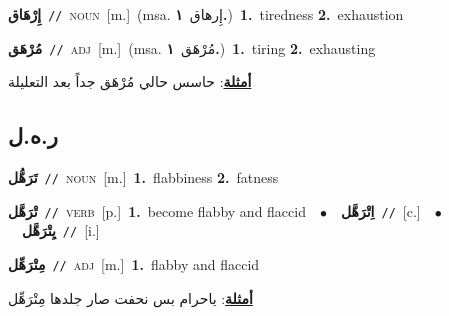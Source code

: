\documentclass[10pt,a4paper,twoside]{article} %
\begin{document}
\begin{multicols}{2}
{\setlength\topsep{0pt}\textbf{\foreignlanguage{arabic}{إِرْهَاق}}\ {\color{gray}\texttt{//}\color{black}}\ \textsc{noun}\ [m.]\ \color{gray}(msa. \foreignlanguage{arabic}{إِرهاق}~\foreignlanguage{arabic}{\textbf{١.}})\color{black}\ \textbf{1.}~tiredness  \textbf{2.}~exhaustion\ } \vspace{2mm}

{\setlength\topsep{0pt}\textbf{\foreignlanguage{arabic}{مُرْهَق}}\ {\color{gray}\texttt{//}\color{black}}\ \textsc{adj}\ [m.]\ \color{gray}(msa. \foreignlanguage{arabic}{مُرْهَق}~\foreignlanguage{arabic}{\textbf{١.}})\color{black}\ \textbf{1.}~tiring  \textbf{2.}~exhausting\  \begin{flushright}\color{gray}\foreignlanguage{arabic}{\textbf{\underline{\foreignlanguage{arabic}{أمثلة}}}: حاسس حالي مُرْهَق جداً بعد التعليلة}\end{flushright}\color{black}} \vspace{2mm}

\vspace{-3mm}
\subsection*{\color{blue}\foreignlanguage{arabic}{ر.ه.ل}\color{blue}{}} 

{\setlength\topsep{0pt}\textbf{\foreignlanguage{arabic}{تَرَهُّل}}\ {\color{gray}\texttt{//}\color{black}}\ \textsc{noun}\ [m.]\ \textbf{1.}~flabbiness  \textbf{2.}~fatness\ } \vspace{2mm}

{\setlength\topsep{0pt}\textbf{\foreignlanguage{arabic}{تْرَهَّل}}\ {\color{gray}\texttt{//}\color{black}}\ \textsc{verb}\ [p.]\ \textbf{1.}~become flabby and flaccid\ \ $\bullet$\ \ \setlength\topsep{0pt}\textbf{\foreignlanguage{arabic}{اِتْرَهَّل}}\ {\color{gray}\texttt{//}\color{black}}\ [c.]\ \ $\bullet$\ \ \setlength\topsep{0pt}\textbf{\foreignlanguage{arabic}{يِتْرَهَّل}}\ {\color{gray}\texttt{//}\color{black}}\ [i.]\ } \vspace{2mm}

{\setlength\topsep{0pt}\textbf{\foreignlanguage{arabic}{مِتْرَهِّل}}\ {\color{gray}\texttt{//}\color{black}}\ \textsc{adj}\ [m.]\ \textbf{1.}~flabby and flaccid\  \begin{flushright}\color{gray}\foreignlanguage{arabic}{\textbf{\underline{\foreignlanguage{arabic}{أمثلة}}}: ياحرام بس نحفت صار جلدها مِتْرَهِّل}\end{flushright}\color{black}} \vspace{2mm}


\end{multicols}
\end{document}
